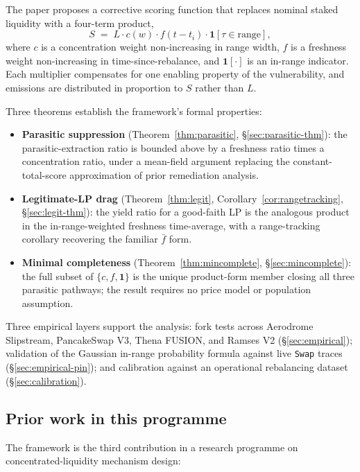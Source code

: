 \documentclass[11pt,a4paper]{article}
\theoremstyle{cgdefinition}
\theoremstyle{cgplain}
\theoremstyle{cgremark}
\begin{document}
The paper proposes a corrective scoring function that replaces nominal staked liquidity with a four-term product,
\[
S \;=\; L \cdot c(w) \cdot f(t - t_i) \cdot \mathbf{1}[\tau \in \text{range}],
\]
where $c$ is a concentration weight non-increasing in range width, $f$ is a freshness weight non-increasing in time-since-rebalance, and $\mathbf{1}[\cdot]$ is an in-range indicator. Each multiplier compensates for one enabling property of the vulnerability, and emissions are distributed in proportion to $S$ rather than $L$.

Three theorems establish the framework's formal properties:
\begin{itemize}[leftmargin=2em]
\item \textbf{Parasitic suppression} (Theorem~\ref{thm:parasitic}, \S\ref{sec:parasitic-thm}): the parasitic-extraction ratio is bounded above by a freshness ratio times a concentration ratio, under a mean-field argument replacing the constant-total-score approximation of prior remediation analysis.
\item \textbf{Legitimate-LP drag} (Theorem~\ref{thm:legit}, Corollary~\ref{cor:rangetracking}, \S\ref{sec:legit-thm}): the yield ratio for a good-faith LP is the analogous product in the in-range-weighted freshness time-average, with a range-tracking corollary recovering the familiar $\bar f$ form.
\item \textbf{Minimal completeness} (Theorem~\ref{thm:mincomplete}, \S\ref{sec:mincomplete}): the full subset of $\{c, f, \mathbf{1}\}$ is the unique product-form member closing all three parasitic pathways; the result requires no price model or population assumption.
\end{itemize}

Three empirical layers support the analysis: fork tests across Aerodrome Slipstream, PancakeSwap V3, Thena FUSION, and Ramses V2 (\S\ref{sec:empirical}); validation of the Gaussian in-range probability formula against live \texttt{Swap} traces (\S\ref{sec:empirical-pin}); and calibration against an operational rebalancing dataset (\S\ref{sec:calibration}).

\subsection{Prior work in this programme}\label{sec:priorwork}

The framework is the third contribution in a research programme on concentrated-liquidity mechanism design:
\end{document}
